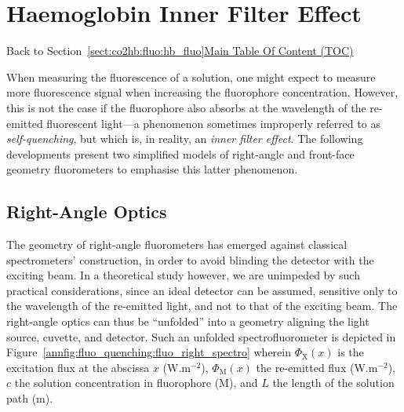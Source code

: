 \chapter{Haemoglobin Inner Filter Effect}\label{app:haemo_self_quench}

\begin{appbox}
	Back to Section~\ref{sect:co2hb:fluo:hb_fluo}\hfill \hyperref[chapter:toc]{Main Table Of Content (TOC)}
\end{appbox}

When measuring the fluorescence of a solution, one might expect to measure more fluorescence signal when increasing the fluorophore concentration. However, this is not the case if the fluorophore also absorbs at the wavelength of the re-emitted fluorescent light---a phenomenon sometimes improperly referred to as \emph{self-quenching}, but which is, in reality, an \emph{inner filter effect}\cite{elisonhirsch1994}. The following developments present two simplified models of right-angle and front-face geometry fluorometers to emphasise this latter phenomenon.

\section{Right-Angle Optics}

The geometry of right-angle fluorometers has emerged against classical spectrometers' construction, in order to avoid blinding the detector with the exciting beam\cite{jameson2003}. In a theoretical study however, we are unimpeded by such practical considerations, since an ideal detector can be assumed, sensitive only to the wavelength of the re-emitted light, and not to that of the exciting beam. The right-angle optics can thus be \enquote{unfolded} into a geometry aligning the light source, cuvette, and detector. Such an unfolded spectrofluorometer is depicted in Figure~\ref{annfig:fluo_quenching:fluo_right_spectro} wherein $\Phi_\text{X}(x)$ is the excitation flux at the abscissa $x$ (W.m$^{-2}$), $\Phi_\text{M}(x)$ the re-emitted flux (W.m$^{-2}$), $c$ the solution concentration in fluorophore (M), and $L$ the length of the solution path (m).

